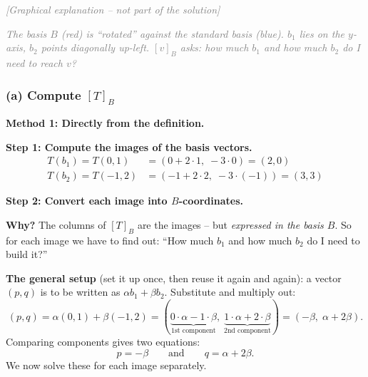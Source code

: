 \documentclass[a4paper,12pt]{article}
\newcommand{\grafik}{\textcolor{gray}{\small\textit{[Graphical explanation -- not part of the solution]}}}
\begin{document}
\grafik

\begin{center}
\end{center}

\textcolor{gray}{\small\textit{The basis $B$ (red) is ``rotated'' against the standard basis (blue). $b_1$ lies on the $y$-axis, $b_2$ points diagonally up-left. $[v]_B$ asks: how much $b_1$ and how much $b_2$ do I need to reach $v$?}}

\subsubsection*{(a) Compute $[T]_B$}

\textbf{Method 1: Directly from the definition.}

\textbf{Step 1: Compute the images of the basis vectors.}
\begin{align*}
T(b_1) = T(0, 1) &= (0 + 2\cdot 1,\; -3 \cdot 0) = (2, 0) \\
T(b_2) = T(-1, 2) &= (-1 + 2\cdot 2,\; -3 \cdot (-1)) = (3, 3)
\end{align*}

\textbf{Step 2: Convert each image into $B$-coordinates.}

\textbf{Why?} The columns of $[T]_B$ are the images -- but \emph{expressed in the basis $B$}. So for each image we have to find out: ``How much $b_1$ and how much $b_2$ do I need to build it?''

\textbf{The general setup} (set it up once, then reuse it again and again): a vector $(p, q)$ is to be written as $\alpha b_1 + \beta b_2$. Substitute and multiply out:
\[
(p, q) = \alpha (0,1) + \beta (-1, 2)
= (\underbrace{0\cdot\alpha - 1\cdot\beta}_{\text{1st component}},\; \underbrace{1\cdot\alpha + 2\cdot\beta}_{\text{2nd component}})
= (-\beta,\; \alpha + 2\beta).
\]
Comparing components gives two equations:
\[
p = -\beta \qquad\text{and}\qquad q = \alpha + 2\beta.
\]
We now solve these for each image separately.
\end{document}
